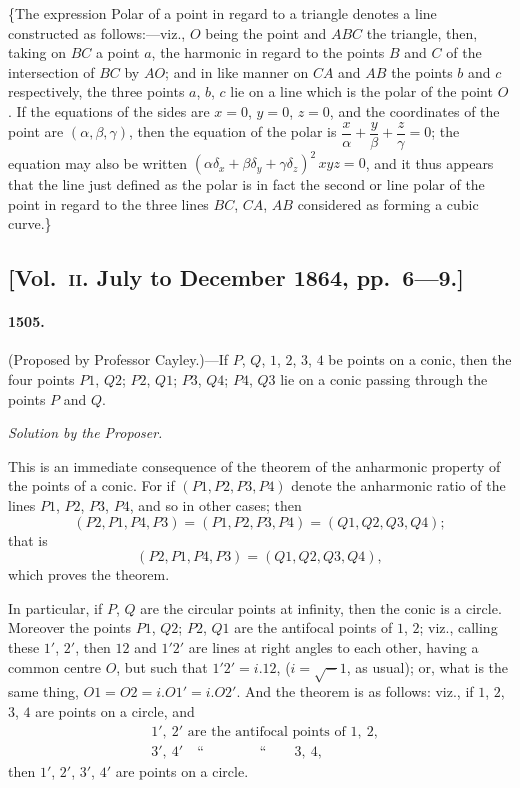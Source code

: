 \documentclass[11pt,a4paper]{article}
\begin{document}
\{The expression Polar of a point in regard to a triangle denotes a line constructed
as follows:---viz., $O$ being the point and $ABC$ the triangle, then, taking on $BC$ a point
$a$, the harmonic in regard to the points $B$ and $C$ of the intersection of $BC$ by $AO$;
and in like manner on $CA$ and $AB$ the points $b$ and $c$ respectively, the three points
$a$, $b$, $c$ lie on a line which is the polar of the point $O$. If the equations of the
sides are $x=0$, $y=0$, $z=0$, and the coordinates of the point are $(\alpha, \beta, \gamma)$, then
the equation of the polar is $\dfrac{x}{\alpha} + \dfrac{y}{\beta} + \dfrac{z}{\gamma} = 0$; the equation may also be written
$(\alpha\delta_x + \beta\delta_y + \gamma\delta_z)^2\,xyz = 0$, and it thus appears that the line just defined as the polar is
in fact the second or line polar of the point in regard to the three lines $BC$, $CA$, $AB$
considered as forming a cubic curve.\}


\subsection*{[Vol.~\textsc{ii}. July to December 1864, pp.\ 6---9.]}

\paragraph*{1505.} (Proposed by Professor Cayley.)---If $P$, $Q$, $1$, $2$, $3$, $4$ be points on a conic,
then the four points $P1$, $Q2$; $P2$, $Q1$; $P3$, $Q4$; $P4$, $Q3$ lie on a conic passing through
the points $P$ and $Q$.

\begin{center}
\textit{Solution by the Proposer.}
\end{center}

This is an immediate consequence of the theorem of the anharmonic property of
the points of a conic. For if $(P1, P2, P3, P4)$ denote the anharmonic ratio of the
lines $P1$, $P2$, $P3$, $P4$, and so in other cases; then
\[
(P2, P1, P4, P3) = (P1, P2, P3, P4) = (Q1, Q2, Q3, Q4);
\]
that is
\[
(P2, P1, P4, P3) = (Q1, Q2, Q3, Q4),
\]
which proves the theorem.

In particular, if $P$, $Q$ are the circular points at infinity, then the conic is a circle.
Moreover the points $P1$, $Q2$; $P2$, $Q1$ are the antifocal points of $1$, $2$; viz., calling these
$1'$, $2'$, then $12$ and $1'2'$ are lines at right angles to each other, having a common
centre $O$, but such that $1'2' = i.12$, ($i=\surd-1$, as usual); or, what is the same thing,
$O1 = O2 = i.O1' = i.O2'$. And the theorem is as follows: viz., if $1$, $2$, $3$, $4$ are points
on a circle, and
\begin{align*}
&1',\ 2' \text{ are the antifocal points of } 1,\ 2,\\
&3',\ 4' \quad \text{``} \qquad\qquad \text{``} \qquad 3,\ 4,
\end{align*}
then $1'$, $2'$, $3'$, $4'$ are points on a circle.
\end{document}
